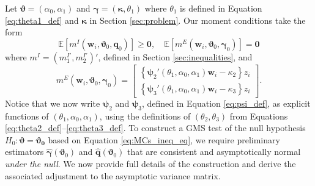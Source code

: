 Let $\boldsymbol{\vartheta} = (\alpha_0, \alpha_1)$ and $\boldsymbol{\gamma} = (\boldsymbol{\kappa}, \theta_1)$ where $\theta_1$ is defined in Equation \ref{eq:theta1_def} and $\boldsymbol{\kappa}$ in Section \ref{sec:problem}.
Our moment conditions take the form 
\begin{equation}
  \mathbb{E}[m^I(\mathbf{w}_i, \boldsymbol{\vartheta}_0, \mathbf{q}_0)] \geq \mathbf{0}, \quad 
  \mathbb{E}[m^E(\mathbf{w}_i, \boldsymbol{\vartheta}_0, \boldsymbol{\gamma}_0)] = \mathbf{0}
  \label{eq:MCs_ineq_eq}
\end{equation}
where $m^I = (m_1^{I'}, m_2^{I'})'$, defined in Section \ref{sec:inequalities}, and 
\begin{equation}
  m^E(\mathbf{w}_i, \boldsymbol{\vartheta}_0, \boldsymbol{\gamma}_0)= \left[
  \begin{array}{c}
 \left\{ \boldsymbol{\psi}_2'(\theta_1, \alpha_0, \alpha_1) \mathbf{w}_i - \kappa_2 \right\}z_i \\
 \left\{ \boldsymbol{\psi}_3'(\theta_1, \alpha_0, \alpha_1) \mathbf{w}_i - \kappa_3 \right\}z_i 
  \end{array}
\right].
\label{eq:mE}
\end{equation}
Notice that we now write $\boldsymbol{\psi}_2$ and $\boldsymbol{\psi}_3$, defined in Equation \ref{eq:psi_def}, as explicit functions of $(\theta_1, \alpha_0, \alpha_1)$, using the definitions of $(\theta_2, \theta_3)$ from Equations \ref{eq:theta2_def}--\ref{eq:theta3_def}.
To construct a GMS test of the null hypothesis $H_0\colon \boldsymbol{\vartheta} = \boldsymbol{\vartheta_0}$ based on Equation \ref{eq:MCs_ineq_eq}, we require preliminary estimators $\widehat{\boldsymbol{\gamma}}(\boldsymbol{\vartheta}_0)$ and $\widehat{\mathbf{q}}(\boldsymbol{\vartheta}_0)$ that are consistent and asymptotically normal \emph{under the null}.
We now provide full details of the construction and derive the associated adjustment to the asymptotic variance matrix.

